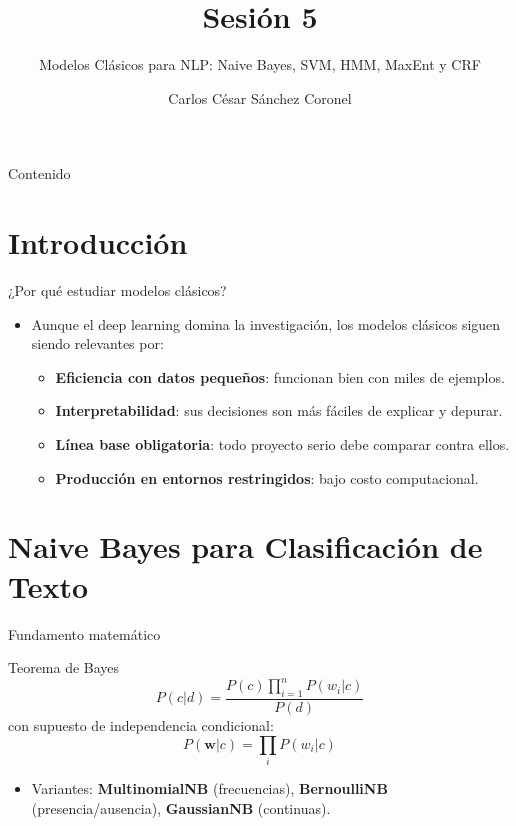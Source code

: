 \documentclass[aspectratio=169, 10pt, xcolor=table]{beamer}
\title[SESIÓN 5 NLP]{\textbf{Sesión 5}}
\subtitle{Modelos Clásicos para NLP: Naive Bayes, SVM, HMM, MaxEnt y CRF}
\author[Prof. C. Sánchez]{Carlos César Sánchez Coronel}
\institute{\textbf{NLP}}
\date{}
\begin{document}
\begin{frame}
    \titlepage
\end{frame}

\begin{frame}{Contenido}
    \tableofcontents
\end{frame}

\section{Introducción}

\begin{frame}{¿Por qué estudiar modelos clásicos?}
    \begin{itemize}
        \item Aunque el deep learning domina la investigación, los modelos clásicos siguen siendo relevantes por:
        \begin{itemize}
            \item \textbf{Eficiencia con datos pequeños}: funcionan bien con miles de ejemplos.
            \item \textbf{Interpretabilidad}: sus decisiones son más fáciles de explicar y depurar.
            \item \textbf{Línea base obligatoria}: todo proyecto serio debe comparar contra ellos.
            \item \textbf{Producción en entornos restringidos}: bajo costo computacional.
        \end{itemize}
    \end{itemize}
\end{frame}

\section{Naive Bayes para Clasificación de Texto}

\begin{frame}{Fundamento matemático}
    \begin{block}{Teorema de Bayes}
        \[
        P(c|d) = \frac{P(c) \prod_{i=1}^{n} P(w_i|c)}{P(d)}
        \]
        con supuesto de independencia condicional:
        \[
        P(\mathbf{w}|c) = \prod_i P(w_i|c)
        \]
    \end{block}
    \begin{itemize}
        \item Variantes: \textbf{MultinomialNB} (frecuencias), \textbf{BernoulliNB} (presencia/ausencia), \textbf{GaussianNB} (continuas).
    \end{itemize}
\end{frame}
\end{document}
